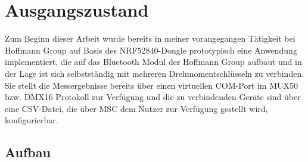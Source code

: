 \section{Ausgangszustand}
Zum Beginn dieser Arbeit wurde bereits in meiner vorangegangen Tätigkeit bei Hoffmann Group auf Basis des NRF52840-Dongle prototypisch eine Anwendung implementiert, die auf das Bluetooth Modul der Hoffmann Group aufbaut und in der Lage ist sich selbstständig mit mehreren Drehmomentschlüsseln zu verbinden. Sie stellt die Messergebnisse bereits über einen virtuellen COM-Port im MUX50 bzw. DMX16 Protokoll zur Verfügung und die zu verbindenden Geräte sind über eine CSV-Datei, die über MSC dem Nutzer zur Verfügung gestellt wird, konfigurierbar.

\subsection{Aufbau}
